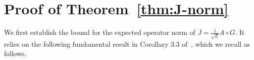 \documentclass[letterpaper,11pt,reqno]{amsart}
\renewcommand{\le}{\leqslant}
\renewcommand{\ge}{\geqslant}
\newcommand{\norm}[1]{\left\Vert#1\right\Vert}
\newcommand{\abs}[1]{\left\vert#1\right\vert}
\newcommand{\mvgt}{{\tau}}
\renewcommand{\odot}{\circ}
\begin{document}

\section{Proof of Theorem~\ref{thm:J-norm}}\label{sec:pf-thm-Jnorm}
We first establish the bound for the expected operator norm of $J = \frac{1}{\sqrt{d}} A \odot G$. It relies on the following fundamental result in Corollary 3.3 of~\cite{BvH16}, which we recall as follows.
\end{document}
